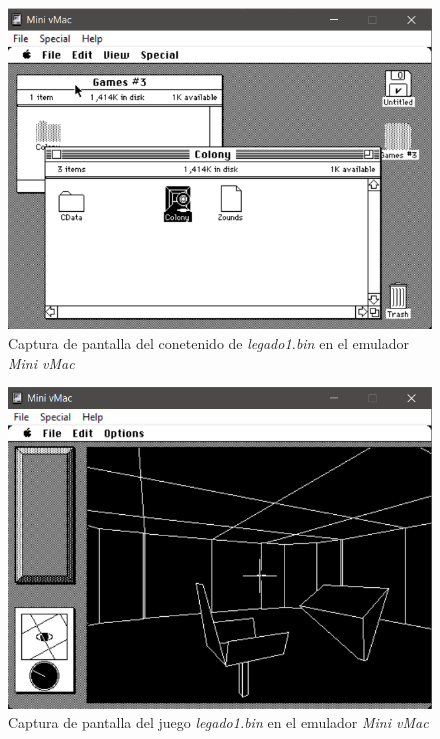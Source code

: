 \documentclass{article}
\begin{document}
\begin{figure}[h!]
    \centering
    \includegraphics[width=0.8\columnwidth]{images/emuladorSF.png}
    \caption{Captura de pantalla del conetenido de \textit{legado1.bin} en el emulador \textit{Mini vMac}}
    \label{fig:emuladorContenidoLegado}
\end{figure}

\begin{figure}[h!]
    \centering
    \includegraphics[width=0.8\columnwidth]{images/emuladorJuego.png}
    \caption{Captura de pantalla del juego \textit{legado1.bin} en el emulador \textit{Mini vMac}}
    \label{fig:emuladorJuego}
\end{figure}
\end{document}
